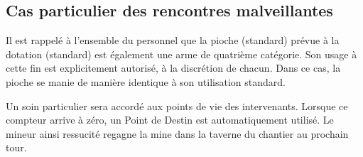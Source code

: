 \subsection{Cas particulier des rencontres malveillantes}
Il est rappelé à l'ensemble du personnel que la pioche (standard) prévue à la dotation (standard) est également une arme de quatrième catégorie. Son usage à cette fin est explicitement autorisé, à la discrétion de chacun. Dans ce cas, la pioche se manie de manière identique à son utilisation standard.

Un soin particulier sera accordé aux points de vie des intervenants. Lorsque ce compteur arrive à zéro, un Point de Destin est automatiquement utilisé. Le mineur ainsi ressucité regagne la mine dans la taverne du chantier au prochain tour.

